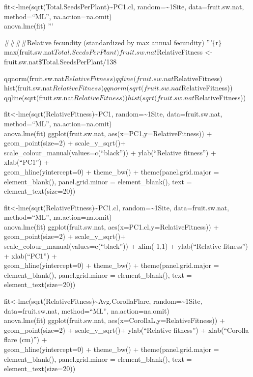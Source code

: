 \documentclass[]{article}
\begin{document}
fit\textless{}-lme(sqrt(Total.SeedsPerPlant)\textasciitilde{}PC1.cl,
random=\textasciitilde{}1\textbar{}Site, data=fruit.sw.nat,
method=``ML'', na.action=na.omit)\\
anova.lme(fit) '''

\#\#\#\#Relative fecundity (standardized by max annual fecundity)
'''\{r\}
max(fruit.sw.nat\(Total.SeedsPerPlant) fruit.sw.nat\)RelativeFitness
\textless{}- fruit.sw.nat\$Total.SeedsPerPlant/138

qqnorm(fruit.sw.nat\(RelativeFitness) qqline(fruit.sw.nat\)RelativeFitness)
hist(fruit.sw.nat\(RelativeFitness) qqnorm(sqrt(fruit.sw.nat\)RelativeFitness))
qqline(sqrt(fruit.sw.nat\(RelativeFitness)) hist(sqrt(fruit.sw.nat\)RelativeFitness))

fit\textless{}-lme(sqrt(RelativeFitness)\textasciitilde{}PC1,
random=\textasciitilde{}1\textbar{}Site, data=fruit.sw.nat,
method=``ML'', na.action=na.omit)\\
anova.lme(fit) ggplot(fruit.sw.nat, aes(x=PC1,y=RelativeFitness)) +
geom\_point(size=2) + scale\_y\_sqrt()+
scale\_colour\_manual(values=c(``black'')) + ylab(``Relative fitness'')
+ xlab(``PC1'') +\\
geom\_hline(yintercept=0) + theme\_bw() + theme(panel.grid.major =
element\_blank(), panel.grid.minor = element\_blank(), text =
element\_text(size=20))

fit\textless{}-lme(sqrt(RelativeFitness)\textasciitilde{}PC1.cl,
random=\textasciitilde{}1\textbar{}Site, data=fruit.sw.nat,
method=``ML'', na.action=na.omit)\\
anova.lme(fit) ggplot(fruit.sw.nat, aes(x=PC1.cl,y=RelativeFitness)) +
geom\_point(size=2) + scale\_y\_sqrt()+
scale\_colour\_manual(values=c(``black'')) + xlim(-1,1) +
ylab(``Relative fitness'') + xlab(``PC1'') +\\
geom\_hline(yintercept=0) + theme\_bw() + theme(panel.grid.major =
element\_blank(), panel.grid.minor = element\_blank(), text =
element\_text(size=20))

fit\textless{}-lme(sqrt(RelativeFitness)\textasciitilde{}Avg.CorollaFlare,
random=\textasciitilde{}1\textbar{}Site, data=fruit.sw.nat,
method=``ML'', na.action=na.omit)\\
anova.lme(fit) ggplot(fruit.sw.nat, aes(x=CorollaL,y=RelativeFitness)) +
geom\_point(size=2) + scale\_y\_sqrt()+ ylab(``Relative fitness'') +
xlab(``Corolla flare (cm)'') +\\
geom\_hline(yintercept=0) + theme\_bw() + theme(panel.grid.major =
element\_blank(), panel.grid.minor = element\_blank(), text =
element\_text(size=20))
\end{document}
